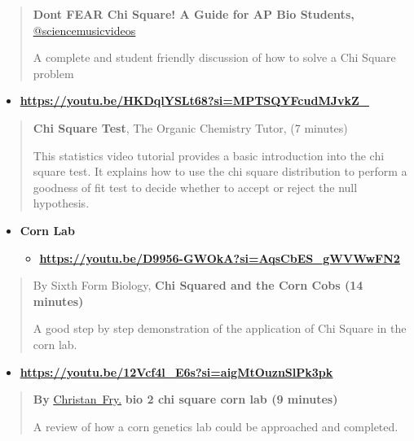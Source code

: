 \documentclass[
  letterpaper,
  DIV=11,
  numbers=noendperiod]{scrreprt}
\providecommand{\tightlist}{%
  \setlength{\itemsep}{0pt}\setlength{\parskip}{0pt}}
\begin{document}
\begin{quote}
\textbf{Don\textquotesingle t FEAR Chi Square! A Guide for AP Bio
Students,}
\ul{\mbox{\href{https://www.youtube.com/@sciencemusicvideos/shorts}{@sciencemusicvideos}}}

A complete and student friendly discussion of how to solve a Chi Square
problem
\end{quote}

\begin{itemize}
\tightlist
\item
  \textbf{\url{https://youtu.be/HKDqlYSLt68?si=MPTSQYFcudMJvkZ_}}
\end{itemize}

\begin{quote}
\textbf{Chi Square Test}, The Organic Chemistry Tutor, (7 minutes)

This statistics video tutorial provides a basic introduction into the
chi square test. It explains how to use the chi square distribution to
perform a goodness of fit test to decide whether to accept or reject the
null hypothesis.
\end{quote}

\begin{itemize}
\item
  \textbf{Corn Lab}

  \begin{itemize}
  \tightlist
  \item
    \href{https://youtu.be/D9956-GWOkA?si=AqsCbES_gWVWwFN2}{\textbf{\ul{https://youtu.be/D9956-GWOkA?si=AqsCbES\_gWVWwFN2}}}
  \end{itemize}
\end{itemize}

\begin{quote}
By Sixth Form Biology, \textbf{Chi Squared and the Corn Cobs (14
minutes)}

A good step by step demonstration of the application of Chi Square in
the corn lab.
\end{quote}

\begin{itemize}
\tightlist
\item
  \textbf{\ul{\mbox{\url{https://youtu.be/12Vcf4l_E6s?si=aigMtOuznSlPk3pk}}}}
\end{itemize}

\begin{quote}
\textbf{By}
\ul{\mbox{\href{https://www.youtube.com/@christanfry9763}{Christan
Fry.}}} \textbf{bio 2 chi square corn lab (9 minutes)}

A review of how a corn genetics lab could be approached and completed.
\end{quote}
\end{document}
